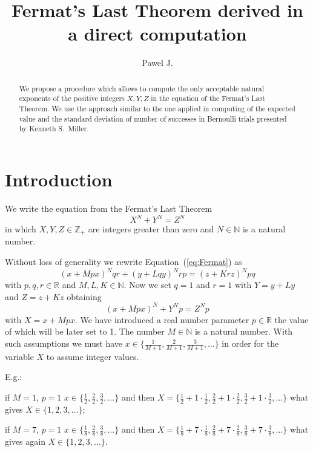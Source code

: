 \documentclass[SecEq,CM,GP]{degruyter-crelle} %
\title[FLT derived in a direct computation]{Fermat's Last Theorem derived in a direct computation}
\author{Pawel J.}{Piskorz}{}{Krakow}
\theoremstyle{plain}
\theoremstyle{definition}
\begin{document}
\begin{abstract}
    We propose a procedure which allows to compute the only acceptable natural
    exponents of the positive integers $X, Y, Z$
    in the equation of the Fermat's Last Theorem. 
    We use the approach similar to the one applied in
    computing of the expected value and the standard deviation of number of successes in Bernoulli 
    trials presented by Kenneth S.~Miller.
\end{abstract}



\section{Introduction}\label{sec:intro}

We write the equation from the Fermat's Last Theorem~\cite{FLT_Wikipedia}
\begin{equation}
\label{eq:Fermat}
X^N + Y^N = Z^N
\end{equation}
in which
$X, Y, Z \in \mathbb{Z_{+}}$ are integers
greater than zero
and $N \in \mathbb{N}$ is a natural number.

Without loss of generality we rewrite Equation~(\ref{eq:Fermat}) as
\begin{equation}
  \label{eq:FermatGeneralEquation}
  (x + Mpx)^{N} qr + (y + Lqy)^{N} rp = (z + Krz)^{N} pq
  \end{equation}
with $p, q, r \in \mathbb{R}$
and $M, L, K \in \mathbb{N}$\@.
Now we set $q=1$ and $r=1$
with $Y = y + Ly$ and $Z = z + Kz$
obtaining
\begin{equation}
\label{eq:FermatEquation}
(x + Mpx)^N + Y^N p = Z^N p
\end{equation}
with $X=x + Mpx$.
We have introduced a real number parameter $p \in \mathbb{R}$ the value of which will 
be later set to 1\@.
The number $M \in \mathbb{N}$ is a natural number.
With such assumptions we must have $x \in \{ \frac{1}{M+1}, \frac{2}{M+1}, \frac{3}{M+1}, \ldots \}$
in order for the variable $X$ to assume integer values.

E.g.:

if $M=1$, $p=1$ $x \in \{ \frac{1}{2}, \frac{2}{2}, \frac{3}{2}, \ldots \}$
and then $X = \{\frac{1}{2} + 1 \cdot \frac{1}{2}, \frac{2}{2} + 1 \cdot \frac{2}{2}, \frac{3}{2} + 1 \cdot \frac{3}{2}, \ldots \}$
what gives 
$X \in \{1, 2, 3, \ldots \}$;

if $M=7$, $p=1$ $x \in \{ \frac{1}{8}, \frac{2}{8}, \frac{3}{8}, \ldots \}$
and then $X = \{\frac{1}{8} + 7 \cdot \frac{1}{8}, \frac{2}{8} + 7 \cdot \frac{2}{8}, \frac{3}{8} + 7 \cdot \frac{3}{8}, \ldots \}$
what gives again
$X \in \{1, 2, 3, \ldots \}$\@.
\end{document}
